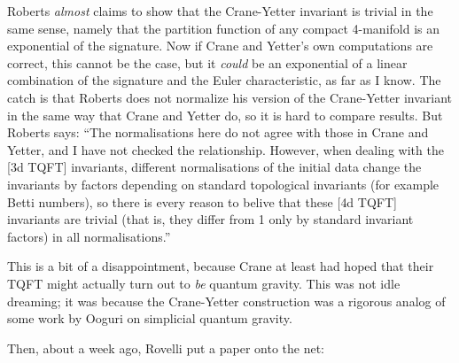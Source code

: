 \documentclass{article}
\def\tightlist{}
\renewcommand{\texttt}[1]{%
  \begingroup
  \ttfamily
  \begingroup\lccode`~=`/\lowercase{\endgroup\def~}{/\discretionary{}{}{}}%
  \begingroup\lccode`~=`[\lowercase{\endgroup\def~}{[\discretionary{}{}{}}%
  \begingroup\lccode`~=`.\lowercase{\endgroup\def~}{.\discretionary{}{}{}}%
  \catcode`/=\active\catcode`[=\active\catcode`.=\active
  \scantokens{#1\noexpand}%
  \endgroup
}
\begin{document}
Roberts \emph{almost} claims to show that the Crane-Yetter invariant is
trivial in the same sense, namely that the partition function of any
compact 4-manifold is an exponential of the signature. Now if Crane and
Yetter's own computations are correct, this cannot be the case, but it
\emph{could} be an exponential of a linear combination of the signature
and the Euler characteristic, as far as I know. The catch is that
Roberts does not normalize his version of the Crane-Yetter invariant in
the same way that Crane and Yetter do, so it is hard to compare results.
But Roberts says: ``The normalisations here do not agree with those in
Crane and Yetter, and I have not checked the relationship. However, when
dealing with the {[}3d TQFT{]} invariants, different normalisations of
the initial data change the invariants by factors depending on standard
topological invariants (for example Betti numbers), so there is every
reason to belive that these {[}4d TQFT{]} invariants are trivial (that
is, they differ from 1 only by standard invariant factors) in all
normalisations.''

This is a bit of a disappointment, because Crane at least had hoped that
their TQFT might actually turn out to \emph{be} quantum gravity. This
was not idle dreaming; it was because the Crane-Yetter construction was
a rigorous analog of some work by Ooguri on simplicial quantum gravity.

Then, about a week ago, Rovelli put a paper onto the net:

\end{document}
